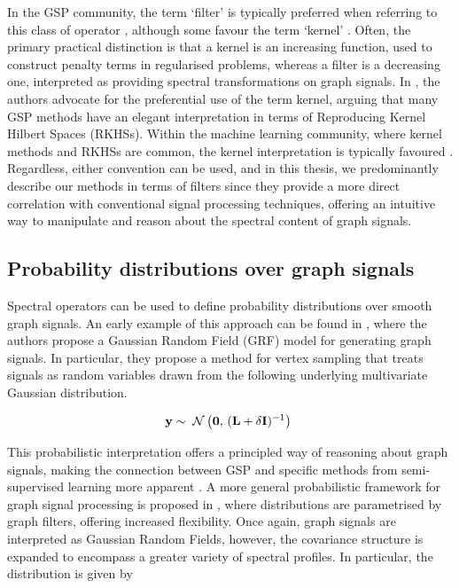 In the GSP community, the term `filter' is typically preferred when referring to this class of operator \citep{Shuman2013}, although some favour the term `kernel' \citep{Ioannidis2016, Romero2017}. Often, the primary practical distinction is that a kernel is an increasing function, used to construct penalty terms in regularised problems, whereas a filter is a decreasing one, interpreted as providing spectral transformations on graph signals. In \cite{Romero2017b}, the authors advocate for the preferential use of the term kernel, arguing that many GSP methods have an elegant interpretation in terms of Reproducing Kernel Hilbert Spaces (RKHSs). Within the machine learning community, where kernel methods and RKHSs are common, the kernel interpretation is typically favoured \citep{Kondor2002, Smola2003}. Regardless, either convention can be used, and in this thesis, we predominantly describe our methods in terms of filters since they provide a more direct correlation with conventional signal processing techniques, offering an intuitive way to manipulate and reason about the spectral content of graph signals.


\subsection{Probability distributions over graph signals}

Spectral operators can be used to define probability distributions over smooth graph signals. An early example of this approach can be found in \cite{Gadde2015}, where the authors propose a Gaussian Random Field (GRF) model for generating graph signals. In particular, they propose a method for vertex sampling that treats signals as random variables drawn from the following underlying multivariate Gaussian distribution.

\begin{equation}
\mathbf{y} \sim \; \mathcal{N}\left(\mathbf{0}, \, (\mathbf{L} + \delta \mathbf{I})^{-1}\right) \;
\end{equation}

This probabilistic interpretation offers a principled way of reasoning about graph signals, making the connection between GSP and specific methods from semi-supervised learning more apparent \citep{Zhu2003}. A more general probabilistic framework for graph signal processing is proposed in \cite{Zhang2015}, where distributions are parametrised by graph filters, offering increased flexibility. Once again, graph signals are interpreted as Gaussian Random Fields, however, the covariance structure is expanded to encompass a greater variety of spectral profiles. In particular, the distribution is given by 

